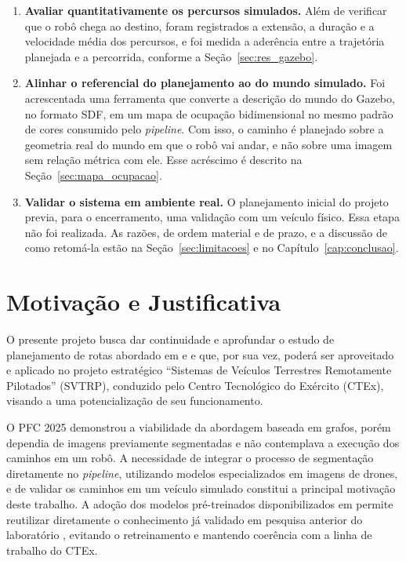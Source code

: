 \documentclass[
    12pt,
    openright,
    oneside,
    a4paper,
    english,
    brazil
]{abntex2}
\begin{document}
\begin{enumerate}
    \item \textbf{Avaliar quantitativamente os percursos simulados.} Além de verificar que o robô chega ao destino, foram registrados a extensão, a duração e a velocidade média dos percursos, e foi medida a aderência entre a trajetória planejada e a percorrida, conforme a Seção~\ref{sec:res_gazebo}.

    \item \textbf{Alinhar o referencial do planejamento ao do mundo simulado.} Foi acrescentada uma ferramenta que converte a descrição do mundo do Gazebo, no formato SDF, em um mapa de ocupação bidimensional no mesmo padrão de cores consumido pelo \textit{pipeline}. Com isso, o caminho é planejado sobre a geometria real do mundo em que o robô vai andar, e não sobre uma imagem sem relação métrica com ele. Esse acréscimo é descrito na Seção~\ref{sec:mapa_ocupacao}.

    \item \textbf{Validar o sistema em ambiente real.} O planejamento inicial do projeto previa, para o encerramento, uma validação com um veículo físico. Essa etapa não foi realizada. As razões, de ordem material e de prazo, e a discussão de como retomá-la estão na Seção~\ref{sec:limitacoes} e no Capítulo~\ref{cap:conclusao}.
\end{enumerate}

\section{Motivação e Justificativa}

O presente projeto busca dar continuidade e aprofundar o estudo de planejamento de rotas abordado em \cite{camelo2025} e \cite{junior2024} e que, por sua vez, poderá ser aproveitado e aplicado no projeto estratégico ``Sistemas de Veículos Terrestres Remotamente Pilotados'' (SVTRP), conduzido pelo Centro Tecnológico do Exército (CTEx), visando a uma potencialização de seu funcionamento.

O PFC 2025 demonstrou a viabilidade da abordagem baseada em grafos, porém dependia de imagens previamente segmentadas e não contemplava a execução dos caminhos em um robô. A necessidade de integrar o processo de segmentação diretamente no \textit{pipeline}, utilizando modelos especializados em imagens de drones, e de validar os caminhos em um veículo simulado constitui a principal motivação deste trabalho. A adoção dos modelos pré-treinados disponibilizados em \cite{junior2024_models} permite reutilizar diretamente o conhecimento já validado em pesquisa anterior do laboratório \cite{junior2024}, evitando o retreinamento e mantendo coerência com a linha de trabalho do CTEx.
\end{document}
